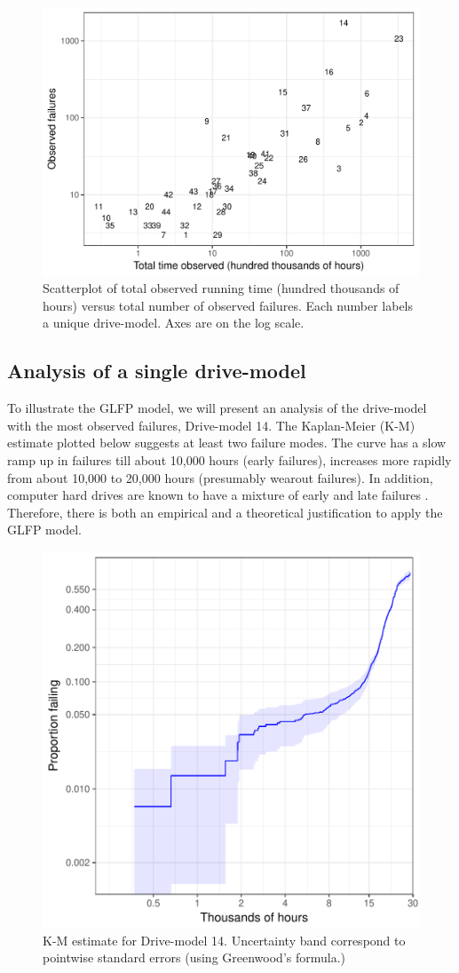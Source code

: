 \documentclass[aap]{imsart}
\begin{document}
\begin{figure}[H]
  \includegraphics[width=.9\textwidth]{dm-summ-scatter.pdf}
  \caption{Scatterplot of total observed running time (hundred thousands of hours) versus total number of observed failures.  Each number labels a unique drive-model.   Axes are on the log scale.}
  \label{drive-scatter}
\end{figure}

\subsection{Analysis of a single drive-model}
\label{subsec:ex1}
To illustrate the GLFP model, we will present an analysis of the drive-model with the most observed failures, Drive-model 14.  The Kaplan-Meier (K-M) estimate plotted below suggests at least two failure modes.  The curve has a slow ramp up in failures till about 10,000 hours (early failures), increases more rapidly from about 10,000 to 20,000 hours (presumably wearout failures).  In addition, computer hard drives are known to have a mixture of early and late failures \citep{chan}.  Therefore, there is both an empirical and a theoretical justification to apply the GLFP model.

\begin{figure}[H]
\centering
  \includegraphics[width=.6\textwidth]{km14-prob}
  \caption{K-M estimate for Drive-model 14.  Uncertainty band correspond to pointwise standard errors (using Greenwood's formula.)}
  \label{fig1}
\end{figure}
\end{document}
